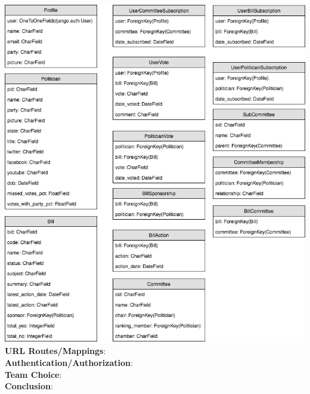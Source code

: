 \documentclass{article}
\newcommand{\n}{\noindent}
\begin{document}
\includegraphics[scale=0.5]{politifind-data-model-UPDATED.png} \\

\n\textbf{URL Routes/Mappings}: \\

\n\textbf{Authentication/Authorization}: \\

\n\textbf{Team Choice}: \\

\n\textbf{Conclusion}: \\
\end{document}
